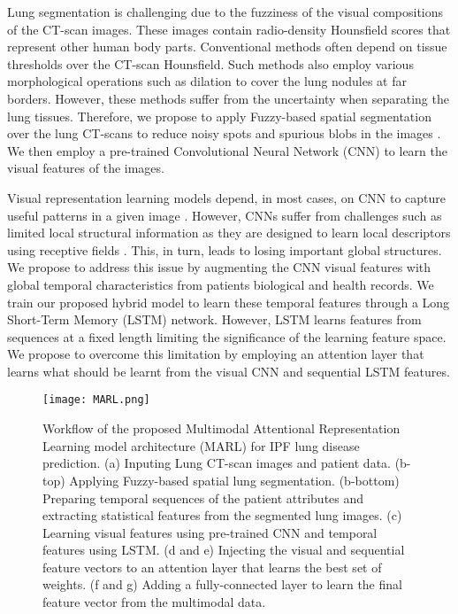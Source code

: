 \documentclass[conference]{IEEEtran}
\begin{document}
Lung segmentation is challenging due to the fuzziness of the visual compositions of the CT-scan images. These images contain radio-density Hounsfield scores that represent other human body parts. Conventional methods often depend on tissue thresholds over the CT-scan Hounsfield. Such methods also employ various morphological operations such as dilation to cover the lung nodules at far borders. However, these methods suffer from the uncertainty when separating the lung tissues. Therefore, we propose to apply Fuzzy-based spatial segmentation over the lung CT-scans to reduce noisy spots and spurious blobs in the images \cite{tripathy2014image}. We then employ a pre-trained Convolutional Neural Network (CNN) to learn the visual features of the images.

Visual representation learning models depend, in most cases, on CNN to capture useful patterns in a given image \cite{tan2019efficientnet}. However, CNNs suffer from challenges such as limited local structural information as they are designed to learn local descriptors using receptive fields \cite{luo2016understanding}. This, in turn, leads to losing important global structures. We propose to address this issue by augmenting the CNN visual features with global temporal characteristics from patients biological and health records. We train our proposed hybrid model to learn these temporal features through a Long Short-Term Memory (LSTM) network. However, LSTM learns features from sequences at a fixed length limiting the significance of the learning feature space. We propose to overcome this limitation by employing an attention layer that learns what should be learnt from the visual CNN and sequential LSTM features. 

%
\begin{figure*}[ht]
\begin{center}
   \texttt{[image: MARL.png]}
\end{center}
   \caption{Workflow of the proposed Multimodal Attentional Representation Learning model architecture (MARL) for IPF lung disease prediction. (a) Inputing Lung CT-scan images and patient data. (b-top) Applying Fuzzy-based spatial lung segmentation. (b-bottom) Preparing temporal sequences of the patient attributes and extracting statistical features from the segmented lung images. (c) Learning visual features using pre-trained CNN and temporal features using LSTM. (d and e) Injecting the visual and sequential feature vectors to an attention layer that learns the best set of weights. (f and g) Adding a fully-connected layer to learn the final feature vector from the multimodal data.}
\label{framework}
\end{figure*}
%
\end{document}
